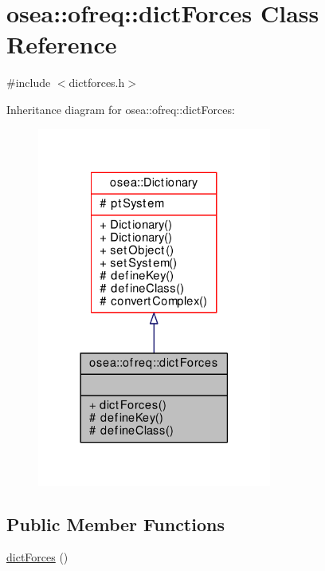 \hypertarget{classosea_1_1ofreq_1_1dict_forces}{\section{osea\-:\-:ofreq\-:\-:dict\-Forces Class Reference}
\label{classosea_1_1ofreq_1_1dict_forces}
}


{\ttfamily \#include $<$dictforces.\-h$>$}



Inheritance diagram for osea\-:\-:ofreq\-:\-:dict\-Forces\-:\nopagebreak
\begin{figure}[H]
\begin{center}
\leavevmode
\includegraphics[width=218pt]{classosea_1_1ofreq_1_1dict_forces__inherit__graph}
\end{center}
\end{figure}
\subsection*{Public Member Functions}
\begin{DoxyCompactItemize}
\item 
\hyperlink{classosea_1_1ofreq_1_1dict_forces_ae9af9b8247c5b69d3041167ff1f898c6}{dict\-Forces} ()
\end{DoxyCompactItemize}
